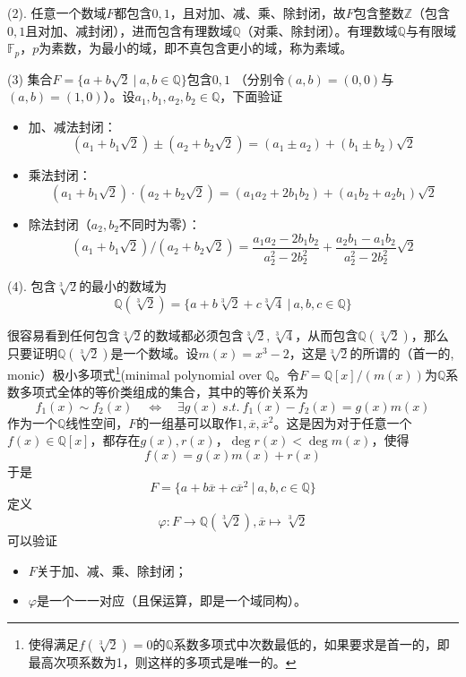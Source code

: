 (2). 任意一个数域$F$都包含$0,1$，且对加、减、乘、除封闭，故$F$包含整数$\mathbb{Z}$（包含$0,1$且对加、减封闭），进而包含有理数域$\mathbb{Q}$（对乘、除封闭）。有理数域$\mathbb{Q}$与有限域$\mathbb{F}_p$，$p$为素数，为最小的域，即不真包含更小的域，称为素域。

(3) 集合$F = \{ a+b\sqrt{2} \ |\ a,b\in\mathbb{Q} \}$包含$0,1$ （分别令$(a,b) = (0,0)$与$(a,b) = (1,0)$）。设$a_1, b_1, a_2, b_2 \in \mathbb{Q}$，下面验证
\begin{itemize}
    \item 加、减法封闭：
    $$(a_1+b_1\sqrt{2}) \pm (a_2+b_2\sqrt{2}) = (a_1 \pm a_2) + (b_1 \pm b_2)\sqrt{2}$$
    \item 乘法封闭：
    $$(a_1+b_1\sqrt{2}) \cdot (a_2+b_2\sqrt{2}) = (a_1a_2+2b_1b_2) + (a_1b_2 + a_2b_1)\sqrt{2}$$
    \item 除法封闭（$a_2, b_2$不同时为零）：
    $$(a_1+b_1\sqrt{2}) / (a_2+b_2\sqrt{2}) = \dfrac{a_1a_2-2b_1b_2}{a_2^2-2b_2^2} + \dfrac{a_2b_1-a_1b_2}{a_2^2-2b_2^2}\sqrt{2}$$
\end{itemize}

(4). 包含$\sqrt[3]{2}$的最小的数域为
$$\mathbb{Q}(\sqrt[3]{2}) = \{ a + b\sqrt[3]{2} + c\sqrt[3]{4} \ |\ a,b,c\in\mathbb{Q} \}$$

很容易看到任何包含$\sqrt[3]{2}$的数域都必须包含$\sqrt[3]{2}, \sqrt[3]{4}$，从而包含$\mathbb{Q}(\sqrt[3]{2})$，那么只要证明$\mathbb{Q}(\sqrt[3]{2})$是一个数域。设$m(x) = x^3 - 2$，这是$\sqrt[3]{2}$的所谓的（首一的, monic）极小多项式\footnote{使得满足$f(\sqrt[3]{2})=0$的$\mathbb{Q}$系数多项式中次数最低的，如果要求是首一的，即最高次项系数为1，则这样的多项式是唯一的。}(minimal polynomial over $\mathbb{Q}$。令$F = \mathbb{Q}[x] / (m(x))$为$\mathbb{Q}$系数多项式全体的等价类组成的集合，其中的等价关系为
$$f_1(x) \sim f_2(x) \quad \Longleftrightarrow \quad \exists g(x) \ s.t.\ f_1(x)-f_2(x) = g(x)m(x)$$
作为一个$\mathbb{Q}$线性空间，$F$的一组基可以取作$1, \overline{x}, \overline{x}^2$。这是因为对于任意一个$f(x) \in \mathbb{Q}[x]$，都存在$g(x), r(x)$，$\deg r(x) < \deg m(x)$，使得
$$f(x) = g(x)m(x) + r(x)$$
于是
$$F = \{ a + b\overline{x} + c\overline{x}^2 \ |\ a,b,c\in\mathbb{Q} \}$$
定义
$$\varphi : F \to \mathbb{Q}(\sqrt[3]{2}), \overline{x} \mapsto \sqrt[3]{2}$$
可以验证
\begin{itemize}
    \item $F$关于加、减、乘、除封闭；
    \item $\varphi$是一个一一对应（且保运算，即是一个域同构）。
\end{itemize}



